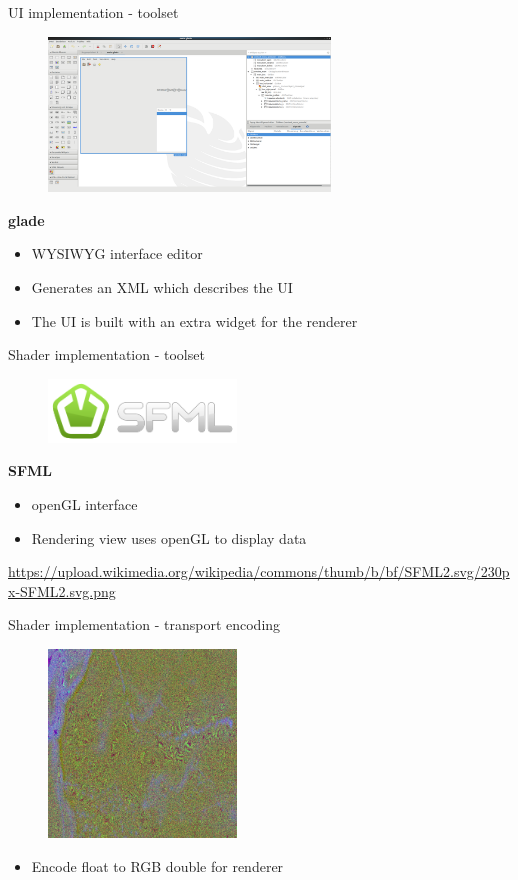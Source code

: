 \documentclass[shortpres,usenames,dvipsnames]{beamer}
\begin{document}
\begin{frame}[fragile]{UI implementation - toolset}
	\begin{figure}
		\includegraphics[clip, width=75mm]{img/glade.png}
	\end{figure}
	\textbf{glade}\\
	\begin{itemize}
		\item WYSIWYG interface editor 
		\item Generates an XML which describes the UI
		\item The UI is built with an extra widget for the renderer
	\end{itemize}
\end{frame}

\begin{frame}[fragile]{Shader implementation - toolset}
	\begin{figure}
		\includegraphics[clip, width=50mm]{img/sfml.png}
	\end{figure}
	\textbf{SFML}\\
	\begin{itemize}
		\item openGL interface
		\item Rendering view uses openGL to display data
	\end{itemize}
	\vfill
	\flushleft
	{\fontsize{5}{5} \selectfont \url{https://upload.wikimedia.org/wikipedia/commons/thumb/b/bf/SFML2.svg/230px-SFML2.svg.png}}
\end{frame}

\begin{frame}[fragile]{Shader implementation - transport encoding}
	\begin{figure}
		\includegraphics[clip, width=50mm]{img/transport_encoding.jpg}
	\end{figure}
	\begin{itemize}
		\item Encode float to RGB double for renderer
	\end{itemize}
\end{frame}
\end{document}
